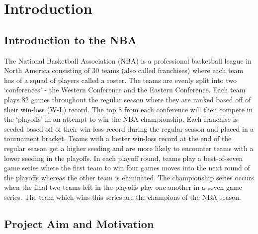 \documentclass[a4paper,11pt,twoside]{article}
\begin{document}
\tableofcontents
\newpage

\section{Introduction}
\vspace{6mm}

\subsection{Introduction to the NBA}

The National Basketball Association (NBA) is a professional basketball league in North America consisting of 30 teams (also called franchises) where each team has of a squad of players called a roster. The teams are evenly split into two `conferences' - the Western Conference and the Eastern Conference. Each team plays 82 games throughout the regular season where they are ranked based off of their win-loss (W-L) record. The top 8 from each conference will then compete in the `playoffs' in an attempt to win the NBA championship. Each franchise is seeded based off of their win-loss record during the regular season and placed in a tournament bracket. Teams with a better win-loss record at the end of the regular season get a higher seeding and are more likely to encounter teams with a lower seeding in the playoffs. In each playoff  round, teams play a best-of-seven game series where the first team to win four games moves into the next round of the playoffs whereas the other team is eliminated. The championship series occurs when the final two teams left in the playoffs play one another in a seven game series. The team which wins this series are the champions of the NBA season.


\subsection{Project Aim and Motivation}
\end{document}
